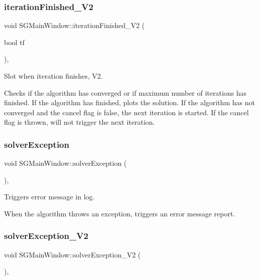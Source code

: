 \subsubsection{\texorpdfstring{iteration\+Finished\+\_\+\+V2}{iterationFinished\_V2}}
{\footnotesize\ttfamily void S\+G\+Main\+Window\+::iteration\+Finished\+\_\+\+V2 (\begin{DoxyParamCaption}\item[{bool}]{tf }\end{DoxyParamCaption})\hspace{0.3cm}{\ttfamily [private]}, {\ttfamily [slot]}}



Slot when iteration finishes, V2. 

Checks if the algorithm has converged or if maximum number of iterations has finished. If the algorithm has finished, plots the solution. If the algorithm has not converged and the cancel flag is false, the next iteration is started. If the cancel flag is thrown, will not trigger the next iteration. \mbox{\label{classSGMainWindow_aa7cb5fa0763b2914492fc518dd175019}} 
\subsubsection{\texorpdfstring{solver\+Exception}{solverException}}
{\footnotesize\ttfamily void S\+G\+Main\+Window\+::solver\+Exception (\begin{DoxyParamCaption}{ }\end{DoxyParamCaption})\hspace{0.3cm}{\ttfamily [private]}, {\ttfamily [slot]}}



Triggers error message in log. 

When the algorithm throws an exception, triggers an error message report. \mbox{\label{classSGMainWindow_a4be88c15c38bbdc162ad410b99e79c0d}} 
\subsubsection{\texorpdfstring{solver\+Exception\+\_\+\+V2}{solverException\_V2}}
{\footnotesize\ttfamily void S\+G\+Main\+Window\+::solver\+Exception\+\_\+\+V2 (\begin{DoxyParamCaption}{ }\end{DoxyParamCaption})\hspace{0.3cm}{\ttfamily [private]}, {\ttfamily [slot]}}



